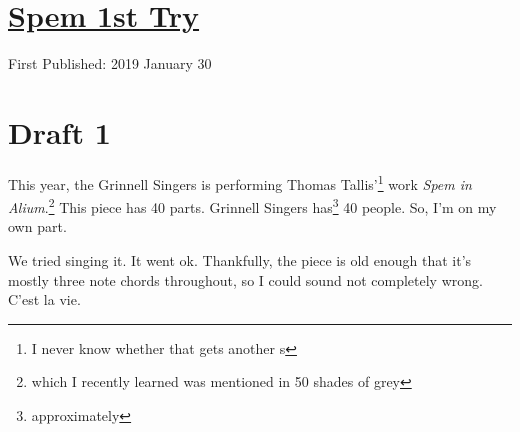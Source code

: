 \documentclass[12pt]{article}[titlepage]
\newcommand{\1}{\={a}}
\newcommand{\2}{\={e}}
\newcommand{\3}{\={\i}}
\newcommand{\4}{\=o}
\newcommand{\5}{\=u}
\newcommand{\6}{\={A}}
\renewcommand{\,}{\textsuperscript{,}}
\begin{document}
\doublespacing
\section{\href{spem-1.html}{Spem 1st Try}}
First Published: 2019 January 30

\section{Draft 1}
This year, the Grinnell Singers is performing Thomas Tallis'\footnote{I never know whether that gets another s} work \textit{Spem in Alium}.\footnote{which I recently learned was mentioned in 50 shades of grey}
This piece has 40 parts.
Grinnell Singers has\footnote{approximately} 40 people.
So, I'm on my own part.

We tried singing it.
It went ok.
Thankfully, the piece is old enough that it's mostly three note chords throughout, so I could sound not completely wrong.
C'est la vie.
\end{document}
